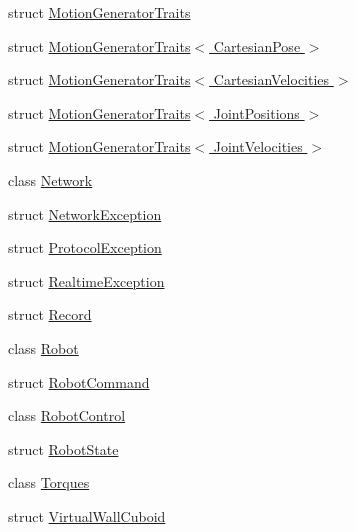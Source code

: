 \begin{DoxyCompactItemize}
struct \hyperlink{structfranka_1_1MotionGeneratorTraits}{Motion\+Generator\+Traits}
\item 
struct \hyperlink{structfranka_1_1MotionGeneratorTraits_3_01CartesianPose_01_4}{Motion\+Generator\+Traits$<$ Cartesian\+Pose $>$}
\item 
struct \hyperlink{structfranka_1_1MotionGeneratorTraits_3_01CartesianVelocities_01_4}{Motion\+Generator\+Traits$<$ Cartesian\+Velocities $>$}
\item 
struct \hyperlink{structfranka_1_1MotionGeneratorTraits_3_01JointPositions_01_4}{Motion\+Generator\+Traits$<$ Joint\+Positions $>$}
\item 
struct \hyperlink{structfranka_1_1MotionGeneratorTraits_3_01JointVelocities_01_4}{Motion\+Generator\+Traits$<$ Joint\+Velocities $>$}
\item 
class \hyperlink{classfranka_1_1Network}{Network}
\item 
struct \hyperlink{structfranka_1_1NetworkException}{Network\+Exception}
\item 
struct \hyperlink{structfranka_1_1ProtocolException}{Protocol\+Exception}
\item 
struct \hyperlink{structfranka_1_1RealtimeException}{Realtime\+Exception}
\item 
struct \hyperlink{structfranka_1_1Record}{Record}
\item 
class \hyperlink{classfranka_1_1Robot}{Robot}
\item 
struct \hyperlink{structfranka_1_1RobotCommand}{Robot\+Command}
\item 
class \hyperlink{classfranka_1_1RobotControl}{Robot\+Control}
\item 
struct \hyperlink{structfranka_1_1RobotState}{Robot\+State}
\item 
class \hyperlink{classfranka_1_1Torques}{Torques}
\item 
struct \hyperlink{structfranka_1_1VirtualWallCuboid}{Virtual\+Wall\+Cuboid}
\end{DoxyCompactItemize}
